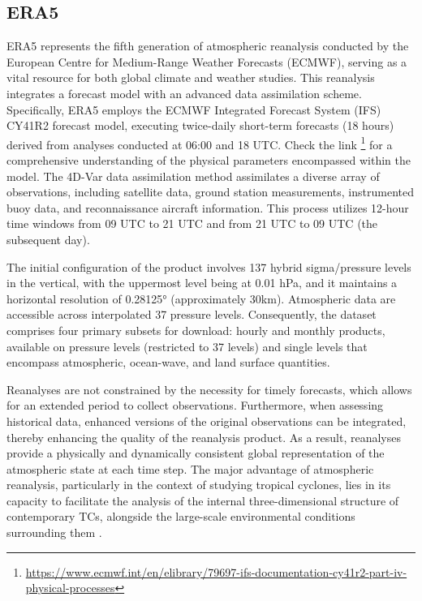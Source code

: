 \subsection{ERA5}

ERA5 \cite{hersbach2020era5} represents the fifth generation of atmospheric reanalysis conducted by the European Centre for Medium-Range Weather Forecasts (ECMWF), serving as a vital resource for both global climate and weather studies. This reanalysis integrates a forecast model with an advanced data assimilation scheme. Specifically, ERA5 employs the ECMWF Integrated Forecast System (IFS) CY41R2 forecast model, executing twice-daily short-term forecasts (18 hours) derived from analyses conducted at 06:00 and 18 UTC. Check the link \footnote{\url{https://www.ecmwf.int/en/elibrary/79697-ifs-documentation-cy41r2-part-iv-physical-processes}}
for a comprehensive understanding of the physical parameters encompassed within the model. The 4D-Var data assimilation method assimilates a diverse array of observations, including satellite data, ground station measurements, instrumented buoy data, and reconnaissance aircraft information. This process utilizes 12-hour time windows from 09 UTC to 21 UTC and from 21 UTC to 09 UTC (the subsequent day).

The initial configuration of the product involves 137 hybrid sigma/pressure levels in the vertical, with the uppermost level being at 0.01 hPa, and it maintains a horizontal resolution of 0.28125° (approximately 30km). Atmospheric data are accessible across interpolated 37 pressure levels. Consequently, the dataset comprises four primary subsets for download: hourly and monthly products, available on pressure levels (restricted to 37 levels) and single levels that encompass atmospheric, ocean-wave, and land surface quantities.

Reanalyses are not constrained by the necessity for timely forecasts, which allows for an extended period to collect observations. Furthermore, when assessing historical data, enhanced versions of the original observations can be integrated, thereby enhancing the quality of the reanalysis product. As a result, reanalyses provide a physically and dynamically consistent global representation of the atmospheric state at each time step. The major advantage of atmospheric reanalysis, particularly in the context of studying tropical cyclones, lies in its capacity to facilitate the analysis of the internal three-dimensional structure of contemporary TCs, alongside the large-scale environmental conditions surrounding them \cite{dulac2024assessing}.

